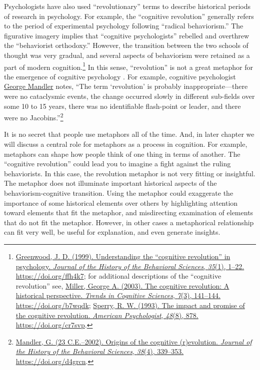 \documentclass[
  oneside,
  12pt]{crumpbook}
\begin{document}
Psychologists have also used ``revolutionary'' terms to describe historical periods of research in psychology. For example, the ``cognitive revolution'' generally refers to the period of experimental psychology following ``radical behaviorism.'' The figurative imagery implies that ``cognitive psychologists'' rebelled and overthrew the ``behaviorist orthodoxy.'' However, the transition between the two schools of thought was very gradual, and several aspects of behaviorism were retained as a part of modern cognition.\footnote{\protect\hyperlink{ref-greenwoodUnderstandingCognitiveRevolution1999}{Greenwood, J. D. (1999). Understanding the {``cognitive revolution''} in psychology. \emph{Journal of the History of the Behavioral Sciences}, \emph{35}(1), 1--22. \url{https://doi.org/ffh4k7}}; for additional descriptions of the {``cognitive revolution''} see, \protect\hyperlink{ref-millerCognitiveRevolutionHistorical2003}{Miller, George A. (2003). The cognitive revolution: A historical perspective. \emph{Trends in Cognitive Sciences}, \emph{7}(3), 141--144. \url{https://doi.org/b7wqdk}}; \protect\hyperlink{ref-sperryImpactPromiseCognitive1993}{Sperry, R. W. (1993). The impact and promise of the cognitive revolution. \emph{American Psychologist}, \emph{48}(8), 878. \url{https://doi.org/cr7svp}}.} In this sense, ``revolution'' is not a great metaphor for the emergence of cognitive psychology . For example, cognitive psychologist \href{https://en.wikipedia.org/wiki/George_Mandler}{George Mandler} notes, ``The term `revolution' is probably inappropriate---there were no cataclysmic events, the change occurred slowly in different sub-fields over some 10 to 15 years, there was no identifiable flash-point or leader, and there were no Jacobins.''\footnote{\protect\hyperlink{ref-mandlerOriginsCognitiveEvolution23}{Mandler, G. (23 C.E.--2002). Origins of the cognitive (r)evolution. \emph{Journal of the History of the Behavioral Sciences}, \emph{38}(4), 339--353. \url{https://doi.org/d4grcn}}.}

It is no secret that people use metaphors all of the time. And, in later chapter we will discuss a central role for metaphors as a process in cognition. For example, metaphors can shape how people think of one thing in terms of another. The ``cognitive revolution'' could lead you to imagine a fight against the ruling behaviorists. In this case, the revolution metaphor is not very fitting or insightful. The metaphor does not illuminate important historical aspects of the behaviorism-cognitive transition. Using the metaphor could exaggerate the importance of some historical elements over others by highlighting attention toward elements that fit the metaphor, and misdirecting examination of elements that do not fit the metaphor. However, in other cases a metaphorical relationship can fit very well, be useful for explanation, and even generate insights.
\end{document}
